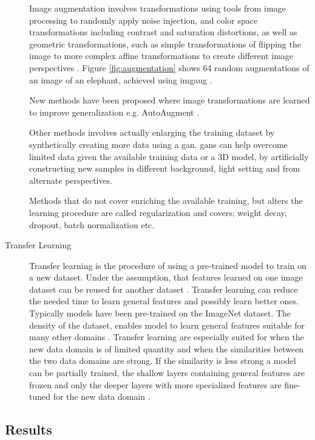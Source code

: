 \begin{description}
	Image augmentation involves transformations using tools from image processing to randomly apply noise injection, and color space transformations including contrast and saturation distortions, as well as geometric transformations, such as simple transformations of flipping the image to more complex affine transformations to create different image perspectives \cite{shorten_survey_2019}. Figure \ref{fig:augmentation} shows 64 random augmentations of an image of an elephant, achieved using \gls{imgaug} \cite{jung_imgaug:_nodate}. 
	
	New methods have been proposed where image transformations are learned to improve generalization e.g. AutoAugment \cite{cubuk_autoaugment:_2018}. 
	
	Other methods involves actually enlarging the training dataset by synthetically creating more data using a \gls{gan}. \gls{gan}s can help overcome limited data given the available training data or a 3D model, by artificially constructing new samples in different background, light setting and from alternate perspectives.
	
	Methods that do not cover enriching the available training, but alters the learning procedure are called regularization and covers; weight decay, dropout, batch normalization etc.
	
	\item[Transfer Learning] Transfer learning is the procedure of using a pre-trained model to train on a new dataset. Under the assumption, that features learned on one image dataset can be reused for another dataset \cite{yosinski_how_2014}. Transfer learning can reduce the needed time to learn general features and possibly learn better ones. Typically models have been pre-trained on the ImageNet dataset. The density of the dataset, enables model to learn general features suitable for many other domains \cite{kornblith_better_2019}. Transfer learning are especially suited for when the new data domain is of limited quantity and when the similarities between the two data domains are strong. If the similarity is less strong a model can be partially trained, the shallow layers containing general features are frozen and only the deeper layers with more specialized features are fine-tuned for the new data domain \cite{li_cs231n:_2018}.
\end{description}

\subsection{Results}

